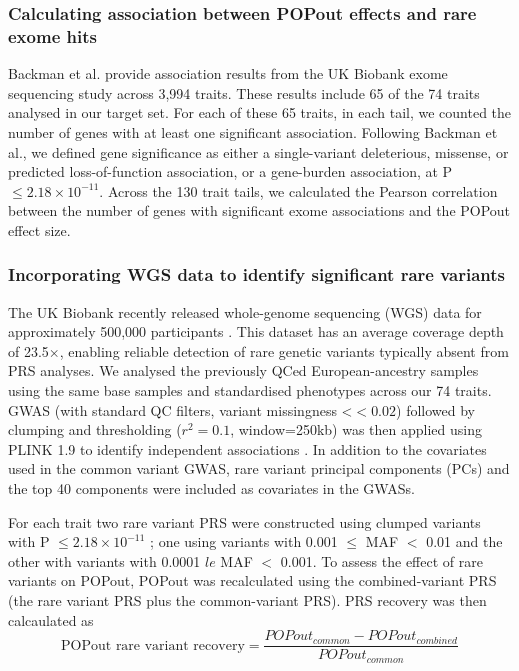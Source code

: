 \documentclass[12pt]{zHenriquesLab-StyleBioRxiv}
\begin{document}
\subsubsection*{Calculating association between POPout effects and rare exome hits}
Backman et al.\cite{Backman2021} provide association results from the
UK Biobank exome sequencing study across 3,994 traits. These results
include 65 of the 74 traits analysed in our target set.  For each of
these 65 traits, in each tail, we counted the number of genes with at
least one significant association. Following Backman et
al.\cite{Backman2021}, we defined gene significance as either a
single-variant deleterious, missense, or predicted loss-of-function
association, or a gene-burden association, at P
$\le 2.18\times 10^{-11}$. Across the 130 trait tails, we calculated
the Pearson correlation between the number of genes with significant
exome associations and the POPout effect size.

\subsubsection*{Incorporating WGS data to identify significant rare variants}
The UK Biobank recently released whole-genome sequencing (WGS) data
for approximately 500,000 participants \cite{ukb, ukb3}. This dataset
has an average coverage depth of 23.5$\times$, enabling reliable
detection of rare genetic variants typically absent from PRS analyses.
We analysed the previously QCed European-ancestry samples using the same
base samples and standardised phenotypes across our 74 traits. GWAS (with standard QC filters, variant missingness <$<0.02$) 
followed by clumping and thresholding ($r^2=0.1$, window=250kb) was
then applied using PLINK 1.9 to identify independent associations
\cite{plink, bt_10}.  In addition to the covariates used in the common
variant GWAS, rare variant principal components (PCs) and the top 40
components were included as covariates in the GWASs.

For each trait two rare variant PRS were constructed using clumped
variants with P $\le 2.18\times 10^{-11}$ \cite{Backman2021}; one using variants with
0.001 $\le$ MAF $<$ 0.01 and the other with variants with 0.0001 $le$
MAF $<$ 0.001. To assess the effect of rare variants on POPout, POPout was
recalculated using the combined-variant PRS (the rare variant PRS plus the
common-variant PRS). PRS recovery was then calcaulated as
\[
  \mbox{POPout rare variant recovery}=\frac{{POPout}_{common}-POPout_{combined}}{POPout_{common}}
\]
\end{document}
